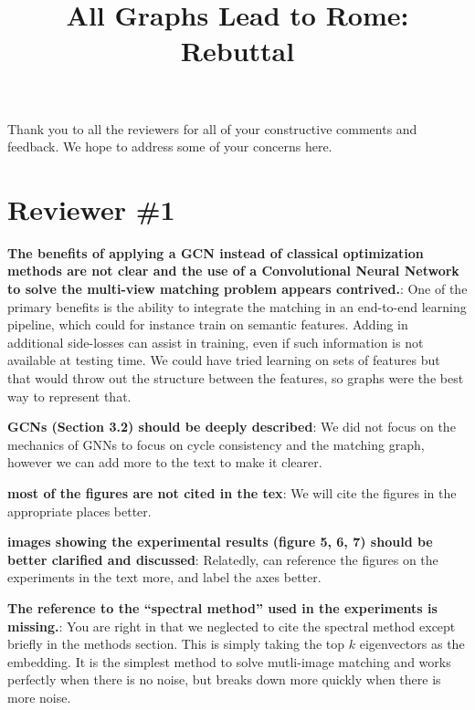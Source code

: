 \documentclass[10pt,twocolumn,letterpaper]{article}
\begin{document}
\title{All Graphs Lead to Rome: Rebuttal}  %

\maketitle
\thispagestyle{empty}


Thank you to all the reviewers for all of your constructive comments and feedback.
We hope to address some of your concerns here.

\section{Reviewer \#1}
\textbf{The benefits of applying a GCN instead of classical optimization methods are not clear and the use of a Convolutional Neural Network to solve the multi-view matching problem appears contrived.}:
One of the primary benefits is the ability to integrate the matching in an end-to-end learning pipeline, which could for instance train on semantic features. Adding in additional side-losses can assist in training, even if such information is not available at testing time. We could have tried learning on sets of features but that would throw out the structure between the features, so graphs were the best way to represent that.

\textbf{GCNs (Section 3.2) should be deeply described}: 
We did not focus on the mechanics of GNNs to focus on cycle consistency and the matching graph, however we can add more to the text to make it clearer.

\textbf{most of the figures are not cited in the tex}: 
We will cite the figures in the appropriate places better.

\textbf{images showing the experimental results (figure 5, 6, 7) should be better clarified and discussed}: 
Relatedly, can reference the figures on the experiments in the text more, and label the axes better.

\textbf{The reference to the “spectral method” used in the experiments is missing.}: 
You are right in that we neglected to cite the spectral method \cite{pachauri2013solving} except briefly in the methods section. This is simply taking the top $k$ eigenvectors as the embedding. It is the simplest method to solve mutli-image matching and works perfectly when there is no noise, but breaks down more quickly when there is more noise.
\end{document}
